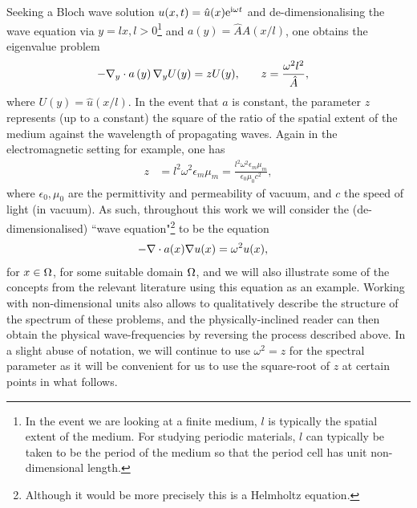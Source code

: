 Seeking a Bloch wave solution $u(x,t) = \hat{u}(x)\mathrm{e}^{\mathrm{i}\omega t}$ and de-dimensionalising the wave equation via $y=lx, l>0$\footnote{In the event we are looking at a finite medium, $l$ is typically the spatial extent of the medium. For studying periodic materials, $l$ can typically be taken to be the period of the medium so that the period cell has unit non-dimensional length.} and $a(y) = \hat{A}A(x/l)$, one obtains the eigenvalue problem
\begin{align*}
	-\nabla_{y}\cdot a\left( y \right)\nabla_{y} U(y) = z U(y),
	&\qquad 
	z = \frac{\omega^2 l^2}{\hat{A}},
\end{align*}
where $U(y)=\hat{u}(x/l)$.
In the event that $a$ is constant, the parameter $z$ represents (up to a constant) the square of the ratio of the spatial extent of the medium against the wavelength of propagating waves.
Again in the electromagnetic setting for example, one has
\begin{align*}
	z &= l^2 \omega^2 \epsilon_{m}\mu_{m}
	= \frac{l^2 \omega^2 \epsilon_{m}\mu_{m}}{\epsilon_0\mu_0 c^2},
\end{align*}
where $\epsilon_0, \mu_0$ are the permittivity and permeability of vacuum, and $c$ the speed of light (in vacuum).
As such, throughout this work we will consider the (de-dimensionalised) ``wave equation"\footnote{Although it would be more precisely this is a Helmholtz equation.} to be the equation
\begin{align} \label{eq:Intro-GeneralWaveEqn}
	-\nabla\cdot a(x)\nabla u(x) &= \omega^2 u(x), 
\end{align}
for $x\in\Omega$, for some suitable domain $\Omega$, and we will also illustrate some of the concepts from the relevant literature using this equation as an example.
Working with non-dimensional units also allows to qualitatively describe the structure of the spectrum of these problems, and the physically-inclined reader can then obtain the physical wave-frequencies by reversing the process described above.
In a slight abuse of notation, we will continue to use $\omega^2 = z$ for the spectral parameter as it will be convenient for us to use the square-root of $z$ at certain points in what follows.

